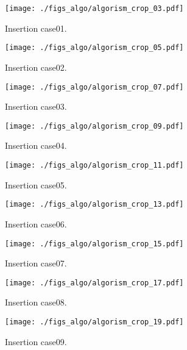\begin{figure}[h]
  \texttt{[image: ./figs\_algo/algorism\_crop\_03.pdf]}
  \caption{
    Insertion case01.
  }
  \label{fig_IpCHashT_insert_hard_case08}
\end{figure}

\begin{figure}[h]
  \texttt{[image: ./figs\_algo/algorism\_crop\_05.pdf]}
  \caption{
    Insertion case02.
  }
  \label{fig_IpCHashT_insert_hard_case08}
\end{figure}

\begin{figure}[h]
  \texttt{[image: ./figs\_algo/algorism\_crop\_07.pdf]}
  \caption{
    Insertion case03.
  }
  \label{fig_IpCHashT_insert_hard_case08}
\end{figure}

\begin{figure}[h]
  \texttt{[image: ./figs\_algo/algorism\_crop\_09.pdf]}
  \caption{
    Insertion case04.
  }
  \label{fig_IpCHashT_insert_hard_case08}
\end{figure}

\begin{figure}[h]
  \texttt{[image: ./figs\_algo/algorism\_crop\_11.pdf]}
  \caption{
    Insertion case05.
  }
  \label{fig_IpCHashT_insert_hard_case08}
\end{figure}

\begin{figure}[h]
  \texttt{[image: ./figs\_algo/algorism\_crop\_13.pdf]}
  \caption{
    Insertion case06.
  }
  \label{fig_IpCHashT_insert_hard_case08}
\end{figure}

\begin{figure}[h]
  \texttt{[image: ./figs\_algo/algorism\_crop\_15.pdf]}
  \caption{
    Insertion case07.
  }
  \label{fig_IpCHashT_insert_hard_case08}
\end{figure}

\begin{figure}[h]
  \texttt{[image: ./figs\_algo/algorism\_crop\_17.pdf]}
  \caption{
    Insertion case08.
  }
  \label{fig_IpCHashT_insert_hard_case08}
\end{figure}

\begin{figure}[h]
  \texttt{[image: ./figs\_algo/algorism\_crop\_19.pdf]}
  \caption{
    Insertion case09.
  }
  \label{fig_IpCHashT_insert_hard_case08}
\end{figure}

